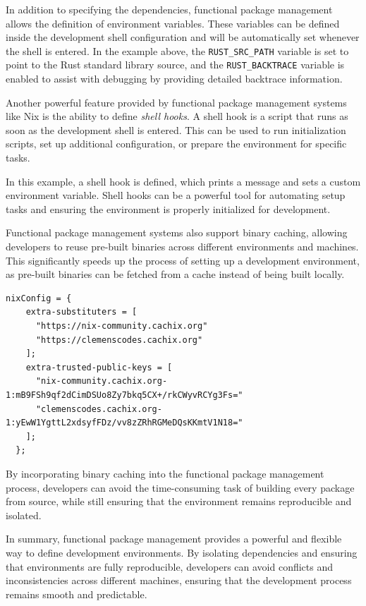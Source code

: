 In addition to specifying the dependencies, functional package management allows
the definition of environment variables. These variables can be defined inside the
development shell configuration and will be automatically set whenever the shell is
entered. In the example above, the \texttt{RUST\_SRC\_PATH} variable is set to
point to the Rust standard library source, and the \texttt{RUST\_BACKTRACE} variable
is enabled to assist with debugging by providing detailed backtrace information.

Another powerful feature provided by functional package management systems like
Nix is the ability to define \textit{shell hooks}. A shell hook is a script that
runs as soon as the development shell is entered. This can be used to run
initialization scripts, set up additional configuration, or prepare the environment
for specific tasks.

In this example, a shell hook is defined, which prints a message and sets a custom
environment variable.
Shell hooks can be a powerful tool for automating setup tasks and ensuring
the environment is properly initialized for development.

Functional package management systems also support binary caching, allowing
developers to reuse pre-built binaries across different environments and machines.
This significantly speeds up the process of setting up a development environment,
as pre-built binaries can be fetched from a cache instead of being built locally.

\begin{lstlisting}[caption={Cachix configuration for functional package management}]
  nixConfig = {
    extra-substituters = [
      "https://nix-community.cachix.org"
      "https://clemenscodes.cachix.org"
    ];
    extra-trusted-public-keys = [
      "nix-community.cachix.org-1:mB9FSh9qf2dCimDSUo8Zy7bkq5CX+/rkCWyvRCYg3Fs="
      "clemenscodes.cachix.org-1:yEwW1YgttL2xdsyfFDz/vv8zZRhRGMeDQsKKmtV1N18="
    ];
  };
\end{lstlisting}

By incorporating binary caching into the functional package management process,
developers can avoid the time-consuming task of building every package from source,
while still ensuring that the environment remains reproducible and isolated.

In summary, functional package management provides a powerful and flexible way to
define development environments. By isolating dependencies and ensuring that
environments are fully reproducible, developers can avoid conflicts and inconsistencies
across different machines, ensuring that the development process remains smooth and
predictable.

